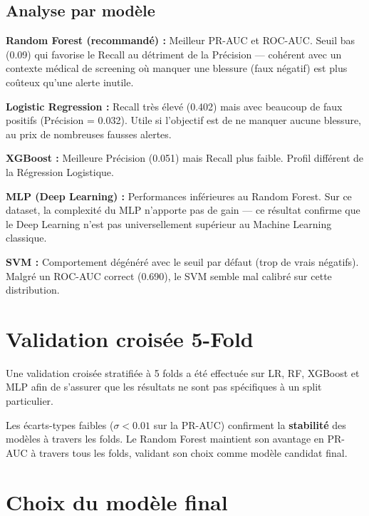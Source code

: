 \documentclass[12pt,a4paper]{report}
\begin{document}
\subsection{Analyse par modèle}

\textbf{Random Forest (recommandé) :} Meilleur PR-AUC et ROC-AUC. Seuil bas (0.09) qui
favorise le Recall au détriment de la Précision — cohérent avec un contexte médical de
screening où manquer une blessure (faux négatif) est plus coûteux qu'une alerte inutile.

\textbf{Logistic Regression :} Recall très élevé (0.402) mais avec beaucoup de faux positifs
(Précision = 0.032). Utile si l'objectif est de ne manquer aucune blessure, au prix de
nombreuses fausses alertes.

\textbf{XGBoost :} Meilleure Précision (0.051) mais Recall plus faible. Profil différent de
la Régression Logistique.

\textbf{MLP (Deep Learning) :} Performances inférieures au Random Forest. Sur ce dataset,
la complexité du MLP n'apporte pas de gain — ce résultat confirme que le Deep Learning n'est
pas universellement supérieur au Machine Learning classique.

\textbf{SVM :} Comportement dégénéré avec le seuil par défaut (trop de vrais négatifs).
Malgré un ROC-AUC correct (0.690), le SVM semble mal calibré sur cette distribution.

\section{Validation croisée 5-Fold}

Une validation croisée stratifiée à 5 folds a été effectuée sur LR, RF, XGBoost et MLP
afin de s'assurer que les résultats ne sont pas spécifiques à un split particulier.

\begin{infobox}[title=Résultats CV (valeurs indicatives — voir cv\_results.csv)]
Les écarts-types faibles ($\sigma < 0.01$ sur la PR-AUC) confirment la \textbf{stabilité}
des modèles à travers les folds. Le Random Forest maintient son avantage en PR-AUC à travers
tous les folds, validant son choix comme modèle candidat final.
\end{infobox}

\section{Choix du modèle final}
\end{document}
